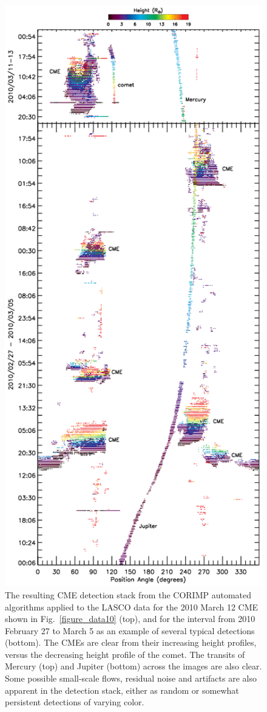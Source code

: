 \documentclass[preprint2]{aastex}
\begin{document}
\begin{figure}[!p]
\centerline{\includegraphics[scale=0.35, clip=true, trim=0 120 0 100]{images/figure_twostack.eps}}
\caption{The resulting CME detection stack from the CORIMP automated algorithms applied to the LASCO data for the 2010 March 12 CME shown in Fig.~\ref{figure_data10} (top), and for the interval from 2010 February 27 to March 5 as an example of several typical detections (bottom). The CMEs are clear from their increasing height profiles, versus the decreasing height profile of the comet. The transits of Mercury (top) and Jupiter (bottom) across the images are also clear. Some possible small-scale flows, residual noise and artifacts are also apparent in the detection stack, either as random or somewhat persistent detections of varying color.}
\label{figure_twostack}
\end{figure}
\end{document}
